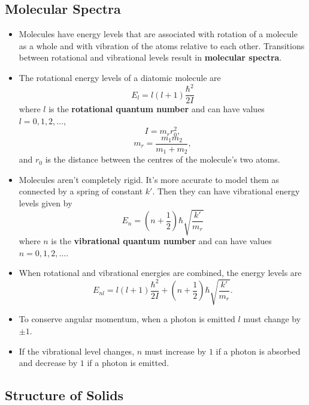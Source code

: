 \documentclass{article}
\begin{document}
\subsection{Molecular Spectra}

\begin{itemize}
  \item Molecules have energy levels that are associated with rotation of a molecule as a whole and with vibration of the atoms relative to each other. Transitions between rotational and vibrational levels result in \textbf{molecular spectra}.

  \item The rotational energy levels of a diatomic molecule are \[E_l = l (l + 1) \frac{\hbar^2}{2 I}\] where $l$ is the \textbf{rotational quantum number} and can have values $l = 0, 1, 2, \ldots$, \[I = m_r r_0^2,\] \[m_r = \frac{m_1 m_2}{m_1 + m_2},\] and $r_0$ is the distance between the centres of the molecule's two atoms.

  \item Molecules aren't completely rigid. It's more accurate to model them as connected by a spring of constant $k'$. Then they can have vibrational energy levels given by \[E_n = \left( n + \frac{1}{2} \right) \hbar \sqrt{\frac{k'}{m_r}}\] where $n$ is the \textbf{vibrational quantum number} and can have values $n = 0, 1, 2, \ldots$.

  \item When rotational and vibrational energies are combined, the energy levels are \[E_{nl} = l (l + 1) \frac{\hbar^2}{2 I} + \left( n + \frac{1}{2} \right) \hbar \sqrt{\frac{k'}{m_r}}.\]

  \item To conserve angular momentum, when a photon is emitted $l$ must change by $\pm 1$.

  \item If the vibrational level changes, $n$ must increase by $1$ if a photon is absorbed and decrease by $1$ if a photon is emitted.
\end{itemize}

\subsection{Structure of Solids}
\end{document}
